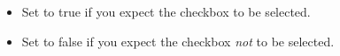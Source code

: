 \begin{itemize}
\item Set to true if you expect the checkbox to be selected.
\item Set to false if you expect the checkbox \emph{not} to be selected.
\end{itemize}
